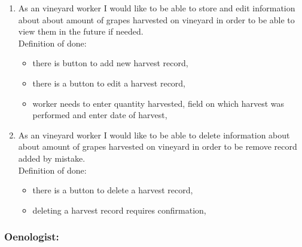 \begin{enumerate}
\begin{itemize}
		\item for each record, the list shows on which field, what variety of grapes was harvested, in what quantity and when it was harvested,
	\end{itemize}
	\item As an vineyard worker I would like to be able to store and edit information about about amount of grapes harvested  on vineyard in order to be able to view them in the future if needed. \\Definition of done:
	\begin{itemize}
		\item there is button to add new harvest record,
		\item there is a button to edit a harvest record,
		\item worker needs to enter quantity harvested, field on which harvest was performed and enter date of harvest,
	\end{itemize}
	\item As an vineyard worker I would like to be able to delete information about about amount of grapes harvested on vineyard in order to be remove record added by mistake. \\Definition of done:
	\begin{itemize}
		\item there is a button to delete a harvest record,
		\item deleting a harvest record requires confirmation,
	\end{itemize}
\end{enumerate}
\subsubsection{Oenologist:}

